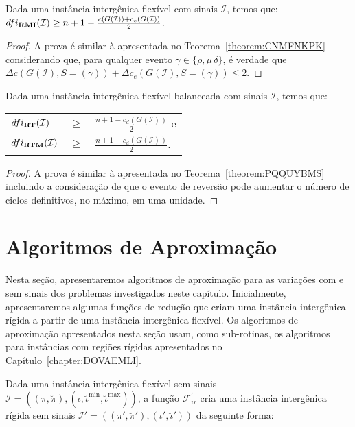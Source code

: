 \begin{theorem}\label{theorem:XQPRYMFX}
Dada uma instância intergênica flexível com sinais $\mathcal{I}$, temos que:\break $dfi_{\textbf{RMI}}(\mathcal{I}) \ge {n+1} - \frac{c(G(\mathcal{I} )) + c_e(G(\mathcal{I} ))}{2}$.
\end{theorem}
\begin{proof}
A prova é similar à apresentada no Teorema~\ref{theorem:CNMFNKPK} considerando que, para qualquer evento $\gamma \in \{\rho, \mu\,\delta\}$, é verdade que $\Delta c(G(\mathcal{I}), S=(\gamma)) + \Delta c_e(G(\mathcal{I}), S=(\gamma)) \le 2$.
\end{proof}

\begin{theorem}\label{theorem:HELIIGVZ}
Dada uma instância intergênica flexível balanceada com sinais $\mathcal{I}$, temos que:

\begin{tabular}{lll}
  $dfi_{\textbf{RT}}(\mathcal{I})$     & $ \ge $ & $\frac{{n+1} - c_d(G(\mathcal{I} ))}{2}$ e \\
  $dfi_{\textbf{RTM}}(\mathcal{I})$    & $ \ge $ & $\frac{{n+1} - c_d(G(\mathcal{I} ))}{2}$.  \\
\end{tabular}
\end{theorem}
\begin{proof}
A prova é similar à apresentada no Teorema~\ref{theorem:PQQUYBMS} incluindo a consideração de que o evento de reversão pode aumentar o número de ciclos definitivos, no máximo, em uma unidade.
\end{proof}

\section{Algoritmos de Aproximação}\label{section:KOSWBFTS}

Nesta seção, apresentaremos algoritmos de aproximação para as variações com e sem sinais dos problemas investigados neste capítulo. Inicialmente, apresentaremos algumas funções de redução que criam uma instância intergênica rígida a partir de uma instância intergênica flexível. Os algoritmos de aproximação apresentados nesta seção usam, como sub-rotinas, os algoritmos para instâncias com regiões rígidas apresentados no Capítulo~\ref{chapter:DOVAEMLI}.

Dada uma instância intergênica flexível sem sinais $\mathcal{I} = ((\pi,\breve\pi),(\iota,\breve\iota^{\min},\breve\iota^{\max}))$, a função $\mathcal{F}_{ir}^{'}$ cria uma instância intergênica rígida sem sinais $\mathcal{I'} = ((\pi',\breve\pi'),(\iota',\breve\iota'))$ da seguinte forma:

